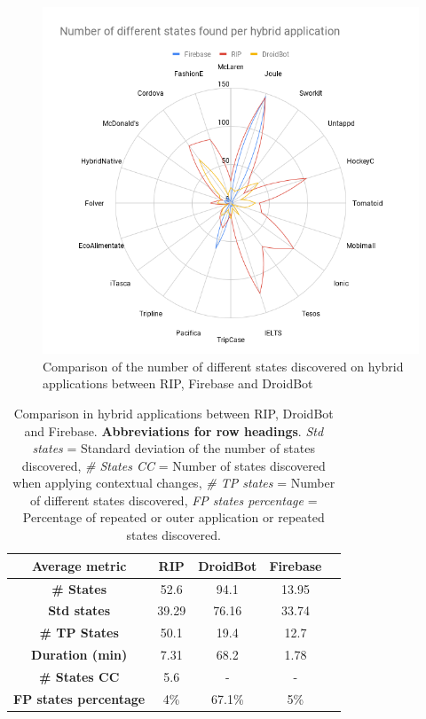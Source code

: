 \begin{figure}[t]
	\centering
	\includegraphics[width=1.1\textwidth]{img/ripRadComp.png}
	\vspace{-0.8cm}
	\caption{Comparison of the number of different states discovered on hybrid applications between RIP, Firebase and DroidBot}
	
	\label{ripRad}
\end{figure} 

\begin{table}[t]
	\centering
	\caption{Comparison in hybrid applications between RIP, DroidBot and Firebase. \textbf{Abbreviations for row headings}. \textit{Std states} = Standard deviation of the number of states discovered,  \textit{\# States CC} = Number of states discovered when applying contextual changes, \textit{ \# TP states} = Number of different states discovered, \textit{FP states percentage} = Percentage of repeated or outer application or repeated states discovered. }
	\label{comparisonRIPHybrid}
	\begin{adjustbox}{width=0.6\textwidth}
		\begin{tabular}{|c|c|c|c|c|}
			\hline
			\textbf{Average metric}&\textbf{RIP} & \textbf{DroidBot} & \textbf{Firebase} \\\hline
			\textbf{\# States}& 52.6 & 94.1 & 13.95 \\\hline
			\textbf{Std states}& 39.29 & 76.16 & 33.74 \\\hline
			\textbf{\# TP States}& 50.1 & 19.4 & 12.7 \\\hline
			\textbf{Duration (min)}& 7.31 & 68.2 & 1.78 \\\hline
			\textbf{\# States CC}& 5.6 & - & - \\\hline
			\textbf{FP states percentage}& 4\% & 67.1\% & 5\% \\\hline
			
		\end{tabular}
	\end{adjustbox}
\end{table}

